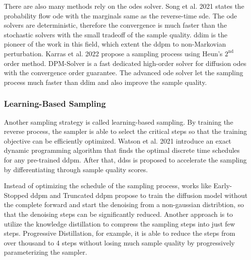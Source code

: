 \documentclass[12pt,DIV14,BCOR12mm,a4paper,footinclude=false,headinclude,parskip=half-,twoside,openright,cleardoublepage=empty,toc=index,bibliography=totoc,listof=totoc]{scrreprt}
\numberwithin{equation}{chapter}
\begin{document}
There are also many methods rely on the \glspl{ode} solver. Song et al. 2021 \cite{song2021scorebased} states the probability flow \gls{ode} with the marginals same as the reverse-time \gls{sde}. The \gls{ode} solvers are deterministic, therefore the convergence is much faster than the stochastic solvers with the small tradeoff of the sample quality. \gls{ddim} \cite{song2022denoising} is the pioneer of the work in this field, which extent the \gls{ddpm} to non-Markovian perturbation. Karras et al. 2022 \cite{karras2022elucidating} propose a sampling process using Heun's $2^{\text{nd}}$ order method. DPM-Solver \cite{lu2022dpmsolver} is a fast dedicated high-order solver for diffusion \glspl{ode} with the convergence order guarantee. The advanced \gls{ode} solver let the sampling process much faster than \gls{ddim} and also improve the sample quality.

\subsubsection{Learning-Based Sampling}
Another sampling strategy is called learning-based sampling. By training the reverse process, the sampler is able to select the critical steps so that the training objective can be efficiently optimized. Watson et al. 2021 \cite{watson2021learning} introduce an exact dynamic programming algorithm that finds the optimal discrete time schedules for any pre-trained \gls{ddpm}. After that, \gls{ddss} \cite{watson2022learning} is proposed to accelerate the sampling by differentiating through sample quality scores. 

Instead of optimizing the schedule of the sampling process, works like Early-Stopped \gls{ddpm} \cite{lyu2022conditional} and Truncated \gls{ddpm} \cite{zheng2023truncated} propose to train the diffusion model without the complete forward and start the denoising from a non-gaussian distribtion, so that the denoising steps can be significantly reduced. Another approach is to utilize the knowledge distillation \cite{salimans2022progressive,meng2023distillation} to compress the sampling steps into just few steps. Progressive Distillation, for example, it is able to reduce the steps from over thousand to 4 steps without losing much sample quality by progressively parameterizing the sampler.
\end{document}
